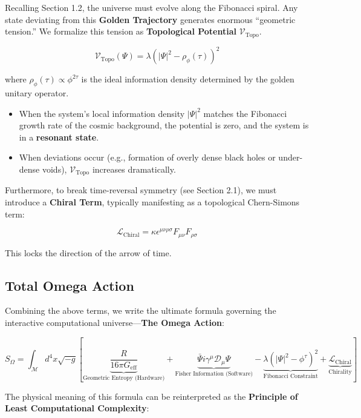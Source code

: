 Recalling Section 1.2, the universe must evolve along the Fibonacci spiral. Any state deviating from this \textbf{Golden Trajectory} generates enormous ``geometric tension.'' We formalize this tension as \textbf{Topological Potential} $\mathcal{V}_{\text{Topo}}$.

\[\mathcal{V}_{\text{Topo}}(\Psi) = \lambda \left( |\Psi|^2 - \rho_{\phi}(\tau) \right)^2\]

where $\rho_{\phi}(\tau) \propto \phi^{2\tau}$ is the ideal information density determined by the golden unitary operator.

\begin{itemize}
\item When the system's local information density $|\Psi|^2$ matches the Fibonacci growth rate of the cosmic background, the potential is zero, and the system is in a \textbf{resonant state}.
\item When deviations occur (e.g., formation of overly dense black holes or under-dense voids), $\mathcal{V}_{\text{Topo}}$ increases dramatically.
\end{itemize}

Furthermore, to break time-reversal symmetry (see Section 2.1), we must introduce a \textbf{Chiral Term}, typically manifesting as a topological Chern-Simons term:

\[\mathcal{L}_{\text{Chiral}} = \kappa \epsilon^{\mu\nu\rho\sigma} F_{\mu\nu} F_{\rho\sigma}\]

This locks the direction of the arrow of time.

\subsection{Total Omega Action}

Combining the above terms, we write the ultimate formula governing the interactive computational universe---\textbf{The Omega Action}:

\[S_{\Omega} = \int_{\mathcal{M}} d^4x \sqrt{-g} \left[ \underbrace{\frac{R}{16\pi G_{\text{eff}}}}_{\text{Geometric Entropy (Hardware)}} + \underbrace{\bar{\Psi} i \gamma^\mu \mathcal{D}_\mu \Psi}_{\text{Fisher Information (Software)}} - \underbrace{\lambda (|\Psi|^2 - \phi^{\tau})^2}_{\text{Fibonacci Constraint}} + \underbrace{\mathcal{L}_{\text{Chiral}}}_{\text{Chirality}} \right]\]

The physical meaning of this formula can be reinterpreted as the \textbf{Principle of Least Computational Complexity}:

